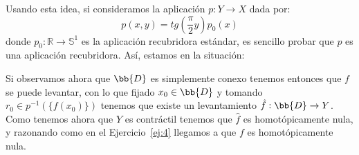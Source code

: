 \documentclass[12pt]{article}
\begin{document}
\begin{ejercicio}
\begin{enumerate}[label=\alph*)]
\begin{description}
\begin{figure}[H]
                    \end{figure}
                    \noindent
                    Usando esta idea, si consideramos la aplicación $p:Y\to X$ dada por:
                    \begin{equation*}
                        p(x,y) = tg\left(\frac{\pi}{2}y\right) p_0(x)
                    \end{equation*}
                    donde $p_0:\mathbb{R}\to\mathbb{S}^1$ es la aplicación recubridora estándar, es sencillo probar que $p$ es una aplicación recubridora. Así, estamos en la situación:
                    \begin{figure}[H]
                        \centering
                    \end{figure}
                    \noindent
                    Si observamos ahora que $\bb{D}$ es simplemente conexo tenemos entonces que $f$ se puede levantar, con lo que fijado $x_0\in \bb{D}$ y tomando $r_0\in p^{-1}(\{f(x_0)\})$ tenemos que existe un levantamiento $\hat{f}:\bb{D}\to Y$. Como tenemos ahora que $Y$ es contráctil tenemos que $\hat{f}$ es homotópicamente nula, y razonando como en el Ejercicio~\ref{ej:4} llegamos a que $f$ es homotópicamente nula.
                \end{description}
        \end{enumerate}
    \end{ejercicio}
\end{document}
